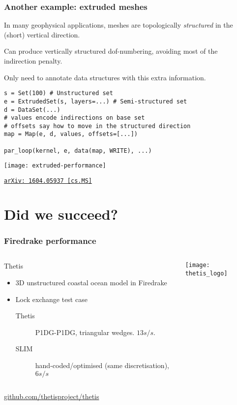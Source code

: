\documentclass[presentation]{beamer}
\newcommand{\arxivlink}[2]{%
  \href{http://www.arxiv.org/abs/#1}%
  {{\small\texttt{arXiv:\,#1\,[#2]}}}%
}
\begin{document}
\begin{frame}[fragile]
  \frametitle{Another example: extruded meshes}
  In many geophysical applications, meshes are topologically \emph{structured} in
  the (short) vertical direction.

  Can produce vertically structured dof-numbering, avoiding most of
  the indirection penalty.

  Only need to annotate data structures with this extra information.
\begin{verbatim}
s = Set(100) # Unstructured set
e = ExtrudedSet(s, layers=...) # Semi-structured set
d = DataSet(...)
# values encode indirections on base set
# offsets say how to move in the structured direction
map = Map(e, d, values, offsets=[...])

par_loop(kernel, e, data(map, WRITE), ...)
\end{verbatim}
\end{frame}

\begin{frame}
  \begin{center}
    \texttt{[image: extruded-performance]}

    \cite{Bercea:2016} \arxivlink{1604.05937}{cs.MS}
  \end{center}
\end{frame}


\section{Did we succeed?}

\begin{frame}
  \frametitle{Firedrake performance}
  \begin{columns}
    \begin{column}{0.7\textwidth}
      \begin{block}{Thetis}
        \begin{itemize}
        \item 3D unstructured coastal ocean model in Firedrake
        \item Lock exchange test case
          \begin{description}
          \item[Thetis] P1DG-P1DG, triangular wedges.  $13s/s$.
          \item[SLIM] hand-coded/optimised (same discretisation),
            $6s/s$
          \end{description}
        \end{itemize}
      \end{block}
    \end{column}
    \begin{column}[t]{0.3\textwidth}
      \texttt{[image: thetis\_logo]}
    \end{column}
  \end{columns}
  \begin{center}
    \url{github.com/thetisproject/thetis}    
  \end{center}
\end{frame}
\end{document}
